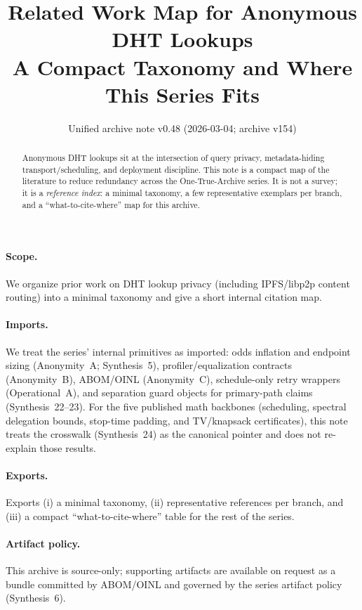 \documentclass[11pt]{article}
\title{Related Work Map for Anonymous DHT Lookups\\
\large A Compact Taxonomy and Where This Series Fits}
\author{}
\date{Unified archive note v0.48 (2026-03-04; archive v154)}
\begin{document}
\maketitle

\begin{abstract}
Anonymous DHT lookups sit at the intersection of query privacy, metadata-hiding transport/scheduling, and deployment discipline.
This note is a compact map of the literature to reduce redundancy across the One-True-Archive series.
It is not a survey; it is a \emph{reference index}: a minimal taxonomy, a few representative exemplars per branch, and a ``what-to-cite-where'' map for this archive.
\end{abstract}

\paragraph{Scope.}
We organize prior work on DHT lookup privacy (including IPFS/libp2p content routing) into a minimal taxonomy and give a short internal citation map.

\paragraph{Imports.}
We treat the series' internal primitives as imported: odds inflation and endpoint sizing (Anonymity~A; Synthesis~5), profiler/equalization contracts (Anonymity~B), ABOM/OINL (Anonymity~C), schedule-only retry wrappers (Operational~A), and separation guard objects for primary-path claims (Synthesis~22--23).\cite{series:oddsinflation,series:endpointbridge,series:profiling,series:abomoinl,series:operationalA,series:primarysepmanifest,series:probsep} For the five published math backbones (scheduling, spectral delegation bounds, stop-time padding, and TV/knapsack certificates), this note treats the crosswalk (Synthesis~24) as the canonical pointer and does not re-explain those results.\cite{series:mathcrosswalk}
\paragraph{Exports.}
Exports (i) a minimal taxonomy, (ii) representative references per branch, and (iii) a compact ``what-to-cite-where'' table for the rest of the series.

\paragraph{Artifact policy.}
This archive is source-only; supporting artifacts are available on request as a bundle committed by ABOM/OINL and governed by the series artifact policy (Synthesis~6).\cite{series:artifactpolicy}
\end{document}
